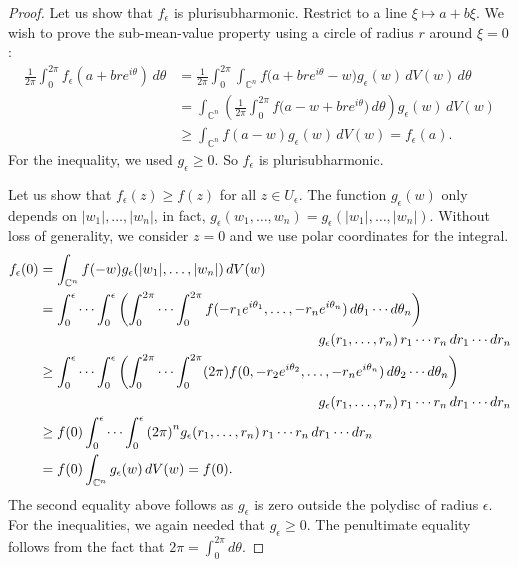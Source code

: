 \documentclass[12pt,openany]{book}
\newcommand{\sabs}[1]{\lvert {#1} \rvert}
\newcommand{\C}{{\mathbb{C}}}
\theoremstyle{plain}
\theoremstyle{remark}
\theoremstyle{definition}
\theoremstyle{exercise}
\theoremstyle{example}
\begin{document}
\begin{proof}
\pagebreak[1]
Let us show that $f_\epsilon$ is plurisubharmonic.
Restrict to a line $\xi \mapsto a+b\xi$.
We wish to prove the sub-mean-value property using a circle
of radius $r$ around $\xi = 0$:
\begin{equation*}
\begin{split}
\frac{1}{2\pi} \int_0^{2\pi} f_\epsilon(a+bre^{i\theta})\, d\theta & =
\frac{1}{2\pi} \int_0^{2\pi}
\int_{\C^n}
f\bigl(a+bre^{i\theta}-w\bigr) g_\epsilon (w) \, dV(w)
\,d\theta
\\
& =
\int_{\C^n}
\left(
\frac{1}{2\pi} \int_0^{2\pi}
f\bigl(a-w+bre^{i\theta}\bigr) \, d\theta \right) g_\epsilon (w) \, dV(w)
\\
& \geq
\int_{\C^n}
f(a-w) g_\epsilon (w) \, dV(w)  = f_\epsilon(a).
\end{split}
\end{equation*}
For the inequality, we used $g_\epsilon \geq 0$.
So $f_\epsilon$ is plurisubharmonic.

Let us show that $f_\epsilon(z) \geq f(z)$ for all $z \in U_\epsilon$.
The function $g_\epsilon(w)$ only depends on $\sabs{w_1},\ldots,\sabs{w_n}$,
in fact,
$g_\epsilon(w_1,\ldots,w_n) =
g_\epsilon(\sabs{w_1},\ldots,\sabs{w_n})$.
Without loss of generality, we consider $z=0$ and we use polar coordinates
for the integral.
\pagebreak[1]
\begin{equation*}
\begin{split}
f_\epsilon(0)
& =
\int_{\C^n} f(-w) g_\epsilon (\sabs{w_1},\ldots,\sabs{w_n})
\, dV(w)
\\
& =
\int_0^\epsilon \cdots
\int_0^\epsilon
\left(
\int_0^{2\pi}
\cdots
\int_0^{2\pi}
 f(-r_1e^{i\theta_1},\ldots,
-r_ne^{i\theta_n}) \,
d\theta_1 \cdots d\theta_n \right)
\\
& \hspace{2.8in}
g_\epsilon (r_1,\ldots,r_n) \,
 r_1 \cdots r_n \,d r_1 \cdots d r_n
\\
& \geq
\int_0^\epsilon \cdots
\int_0^\epsilon
\left(
\int_0^{2\pi}
\cdots
\int_0^{2\pi}
(2\pi)
 f(0,-r_2e^{i\theta_2},\ldots,
-r_ne^{i\theta_n}) \,
d\theta_2 \cdots d\theta_n \right)
\\
& \hspace{2.8in}
g_\epsilon (r_1,\ldots,r_n) \,
 r_1 \cdots r_n \,d r_1 \cdots d r_n
\\
& \geq
f(0)
\int_0^\epsilon \cdots
\int_0^\epsilon
{(2\pi)}^n
g_\epsilon (r_1,\ldots,r_n) \,
 r_1 \cdots r_n \,d r_1 \cdots d r_n
\\
& = f(0) \int_{\C^n} g_\epsilon (w) \, dV(w)
= f(0) .
\end{split}
\end{equation*}
The second equality above
follows as $g_\epsilon$ is zero
outside the polydisc of radius $\epsilon$.
For the inequalities, we again needed that $g_\epsilon \geq 0$.
The penultimate equality follows from the fact that
$2\pi = \int_0^{2\pi}d \theta$.


\end{proof}
\end{document}
